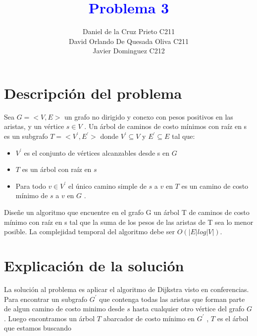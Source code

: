 \documentclass{article}
\begin{document}
    \title{\textcolor{blue}{\textbf{Problema 3 }}\\}
    \author{Daniel de la Cruz Prieto C211\\ David Orlando De Quesada Oliva C211\\Javier Dominguez C212} 
    \date{}
    \maketitle  

    \section{Descripci\'on del problema} 

    Sea $G = <V,E>$ un grafo no dirigido y conexo con pesos positivos en las aristas, y un v\'ertice $s \in V$ . Un \'arbol de 
    caminos de costo m\'inimos con ra\'iz en s es un subgrafo $T = <V^{'} , E^{'}> $ donde $V^{'} \subseteq  V $     y $E^{'} \subseteq  E $ tal que: 
    
    \begin{itemize}
        \item $V^{'}$ es el conjunto de v\'ertices alcanzables desde s en $G$
        \item $T$ es un \'arbol con ra\'iz en $s$
        \item Para todo $v \in V^{'}$ el \'unico camino simple de $s$ a $v$ en $T$ es un camino de costo m\'inimo de $s$ a $v$ en $G$ .
    \end{itemize}

    \noindent Dise\~ne un algoritmo que encuentre en el grafo G un \'arbol T de caminos de costo m\'inimo con ra\'iz en s tal que
    la suma de los pesos de las aristas de T sea lo menor posible. La complejidad temporal del algoritmo debe ser
    $O(|E|log|V|)$.


    \section{ Explicaci\'on de la soluci\'on }

    \noindent La soluci\'on al problema es aplicar el algoritmo de  Dijkstra visto en conferencias.
    Para encontrar un subgrafo $G^{'}$ que contenga todas las aristas que forman parte de algun camino de 
    costo minimo desde $s$ hasta cualquier otro v\'ertice del grafo $G$. Luego encontramos un \'arbol $T$ abarcador de 
    costo m\'inimo en $G^{'}$ , $T$ es el \'arbol que estamos buscando 
\end{document}
